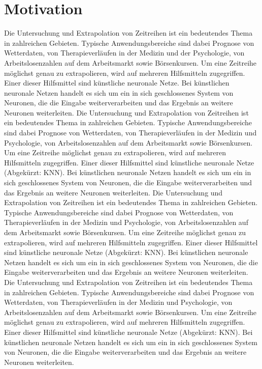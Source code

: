 \documentclass[a4paper,DIV11,bibliography=totoc,headings=normal,ngerman,headsepline,listof=totoc]{scrreprt}
\begin{document}
\section{Motivation}
\label{sec:Motivation}
Die Untersuchung  und Extrapolation von Zeitreihen ist ein bedeutendes Thema in zahlreichen Gebieten. Typische Anwendungsbereiche sind dabei Prognose von Wetterdaten, von Therapieverläufen in der  Medizin und der Psychologie, von Arbeitslosenzahlen auf dem Arbeitsmarkt sowie Börsenkursen. Um eine Zeitreihe möglichst genau zu extrapolieren, wird auf mehreren Hilfsmitteln zugegriffen. Einer dieser Hilfsmittel sind künstliche neuronale Netze. Bei künstlichen neuronale Netzen handelt es sich um ein in sich geschlossenes System von Neuronen, die die Eingabe weiterverarbeiten und das Ergebnis an weitere Neuronen weiterleiten.  
Die Untersuchung  und Extrapolation von Zeitreihen ist ein bedeutendes Thema in zahlreichen Gebieten. Typische Anwendungsbereiche sind dabei Prognose von Wetterdaten, von Therapieverläufen in der  Medizin und Psychologie, von Arbeitslosenzahlen auf dem Arbeitsmarkt sowie Börsenkursen. Um eine Zeitreihe möglichst genau zu extrapolieren, wird auf mehreren Hilfsmitteln zugegriffen. Einer dieser Hilfsmittel sind künstliche neuronale Netze (Abgekürzt: KNN). Bei künstlichen neuronale Netzen handelt es sich um ein in sich geschlossenes System von Neuronen, die die Eingabe weiterverarbeiten und das Ergebnis an weitere Neuronen weiterleiten. 
Die Untersuchung  und Extrapolation von Zeitreihen ist ein bedeutendes Thema in zahlreichen Gebieten. Typische Anwendungsbereiche sind dabei Prognose von Wetterdaten, von Therapieverläufen in der  Medizin und Psychologie, von Arbeitslosenzahlen auf dem Arbeitsmarkt sowie Börsenkursen. Um eine Zeitreihe möglichst genau zu extrapolieren, wird auf mehreren Hilfsmitteln zugegriffen. Einer dieser Hilfsmittel sind künstliche neuronale Netze (Abgekürzt: KNN). Bei künstlichen neuronale Netzen handelt es sich um ein in sich geschlossenes System von Neuronen, die die Eingabe weiterverarbeiten und das Ergebnis an weitere Neuronen weiterleiten. 
Die Untersuchung  und Extrapolation von Zeitreihen ist ein bedeutendes Thema in zahlreichen Gebieten. Typische Anwendungsbereiche sind dabei Prognose von Wetterdaten, von Therapieverläufen in der  Medizin und Psychologie, von Arbeitslosenzahlen auf dem Arbeitsmarkt sowie Börsenkursen. Um eine Zeitreihe möglichst genau zu extrapolieren, wird auf mehreren Hilfsmitteln zugegriffen. Einer dieser Hilfsmittel sind künstliche neuronale Netze (Abgekürzt: KNN). Bei künstlichen neuronale Netzen handelt es sich um ein in sich geschlossenes System von Neuronen, die die Eingabe weiterverarbeiten und das Ergebnis an weitere Neuronen weiterleiten.
\end{document}
